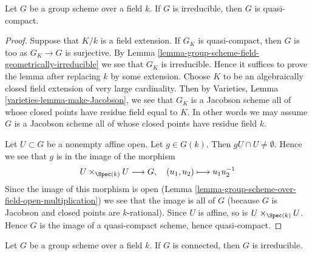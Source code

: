 \begin{lemma}
\label{lemma-irreducible-group-scheme-over-field-qc}
Let $G$ be a group scheme over a field $k$. If $G$ is irreducible,
then $G$ is quasi-compact.
\end{lemma}

\begin{proof}
Suppose that $K/k$ is a field extension. If $G_K$
is quasi-compact, then $G$ is too as $G_K \to G$ is surjective.
By Lemma \ref{lemma-group-scheme-field-geometrically-irreducible}
we see that $G_K$ is irreducible. Hence it suffices to prove the lemma
after replacing $k$ by some extension. Choose $K$ to be an algebraically
closed field extension of very large cardinality. Then by
Varieties, Lemma \ref{varieties-lemma-make-Jacobson},
we see that $G_K$ is a Jacobson scheme all of whose closed points have residue
field equal to $K$. In other words we may assume $G$ is a Jacobson
scheme all of whose closed points have residue field $k$.

\medskip\noindent
Let $U \subset G$ be a nonempty affine open. Let $g \in G(k)$. Then
$gU \cap U \not = \emptyset$. Hence we see that $g$ is in the image
of the morphism
$$
U \times_{\Spec(k)} U \longrightarrow G, \quad
(u_1, u_2) \longmapsto u_1u_2^{-1}
$$
Since the image of this morphism is open
(Lemma \ref{lemma-group-scheme-over-field-open-multiplication})
we see that the image is all of $G$ (because $G$ is Jacobson
and closed points are $k$-rational).
Since $U$ is affine, so is $U \times_{\Spec(k)} U$. Hence $G$ is the
image of a quasi-compact scheme, hence quasi-compact.
\end{proof}

\begin{lemma}
\label{lemma-connected-group-scheme-over-field-irreducible}
Let $G$ be a group scheme over a field $k$. If $G$ is connected,
then $G$ is irreducible.
\end{lemma}

